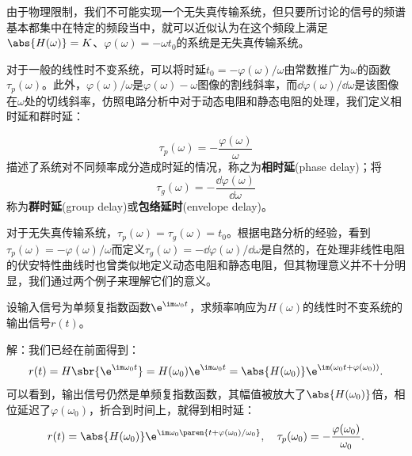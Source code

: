 由于物理限制，我们不可能实现一个无失真传输系统，但只要所讨论的信号的频谱基本都集中在特定的频段当中，就可以近似认为在这个频段上满足$\abs{H(\omega)}=K$、$\varphi(\omega)=-\omega t_0$的系统是无失真传输系统。

对于一般的线性时不变系统，可以将时延$t_0=-\varphi(\omega)/\omega$由常数推广为$\omega$的函数$\tau_p(\omega)$。此外，$\varphi(\omega)/\omega$是$\varphi(\omega)-\omega$图像的割线斜率，而$\dd\varphi(\omega)/\dd\omega$是该图像在$\omega$处的切线斜率，仿照电路分析中对于动态电阻和静态电阻的处理，我们定义相时延和群时延\cite{signal_systems}：
\begin{definition}[相时延和群时延]
    \label{def:delay}
    \begin{equation}
        \tau_p(\omega)=-\frac{\varphi(\omega)}{\omega}
    \end{equation}
    描述了系统对不同频率成分造成时延的情况，称之为\textbf{相时延}(phase delay)；将
    \begin{equation}
        \tau_g(\omega)=-\frac{\dd\varphi(\omega)}{\dd\omega}
    \end{equation}
    称为\textbf{群时延}(group delay)或\textbf{包络延时}(envelope delay)。
\end{definition}

对于无失真传输系统，$\tau_p(\omega)=\tau_g(\omega)=t_0$。根据电路分析的经验，看到$\tau_p(\omega)=-\varphi(\omega)/\omega$而定义$\tau_g(\omega)=-\dd\varphi(\omega)/\dd\omega$是自然的，在处理非线性电阻的伏安特性曲线时也曾类似地定义动态电阻和静态电阻，但其物理意义并不十分明显，我们通过两个例子来理解它们的意义。

\begin{example}[相时延]\label{exmp:phase_delay}
    设输入信号为单频复指数函数$\e^{\im\omega_0 t}$，求频率响应为$H(\omega)$的线性时不变系统的输出信号$r(t)$。

    解：我们已经在前面得到：
    \begin{equation}
        r(t)=H\sbr{\e^{\im\omega_0 t}}=H(\omega_0)\e^{\im\omega_0 t}=\abs{H(\omega_0)}\e^{\im(\omega_0 t+\varphi(\omega_0))}.
    \end{equation}
    可以看到，输出信号仍然是单频复指数函数，其幅值被放大了$\abs{H(\omega_0)}$倍，相位延迟了$\varphi(\omega_0)$，折合到时间上，就得到相时延：
    \begin{equation}
        r(t)=\abs{H(\omega_0)}\e^{\im\omega_0\paren{t+\varphi(\omega_0)/\omega_0}},\quad \tau_p(\omega_0)=-\frac{\varphi(\omega_0)}{\omega_0}.
    \end{equation}
\end{example}

